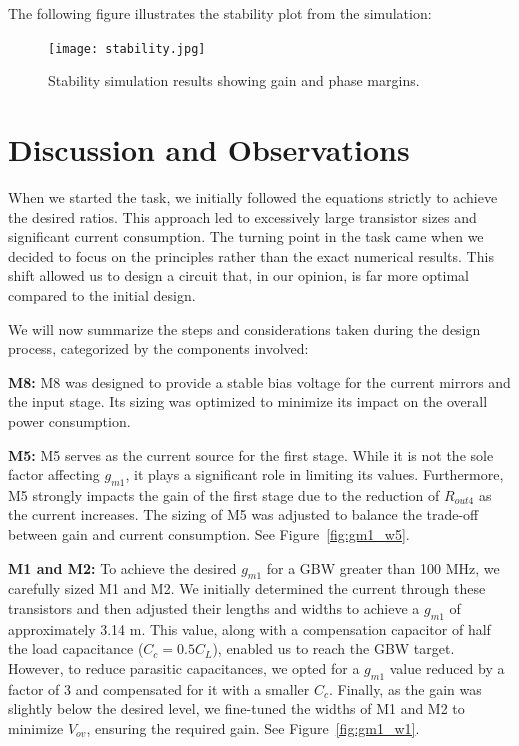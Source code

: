 \documentclass[12pt,a4paper]{article}
\begin{document}
The following figure illustrates the stability plot from the simulation:

\begin{figure}[H]
    \centering
    \texttt{[image: stability.jpg]}
    \caption{Stability simulation results showing gain and phase margins.}
    \label{fig:stability}
\end{figure}
\pagebreak

\section*{Discussion and Observations}
When we started the task, we initially followed the equations strictly to achieve the desired ratios. This approach led to excessively large transistor sizes and significant current consumption. The turning point in the task came when we decided to focus on the principles rather than the exact numerical results. This shift allowed us to design a circuit that, in our opinion, is far more optimal compared to the initial design.

We will now summarize the steps and considerations taken during the design process, categorized by the components involved:

\textbf{M8:}  
M8 was designed to provide a stable bias voltage for the current mirrors and the input stage. Its sizing was optimized to  minimize its impact on the overall power consumption.

\textbf{M5:}  
M5 serves as the current source for the first stage. While it is not the sole factor affecting $g_{m1}$, it plays a significant role in limiting its values. Furthermore, M5 strongly impacts the gain of the first stage due to the reduction of $R_{out4}$ as the current increases. The sizing of M5 was adjusted to balance the trade-off between gain and current consumption. See Figure~\ref{fig:gm1_w5}.  

\textbf{M1 and M2:}  
To achieve the desired $g_{m1}$ for a GBW greater than 100 MHz, we carefully sized M1 and M2. We initially determined the current through these transistors and then adjusted their lengths and widths to achieve a $g_{m1}$ of approximately 3.14 m. This value, along with a compensation capacitor of half the load capacitance ($C_c = 0.5C_L$), enabled us to reach the GBW target. However, to reduce parasitic capacitances, we opted for a $g_{m1}$ value reduced by a factor of 3 and compensated for it with a smaller $C_c$. Finally, as the gain was slightly below the desired level, we fine-tuned the widths of M1 and M2 to minimize $V_{ov}$, ensuring the required gain. See Figure~\ref{fig:gm1_w1}.
\end{document}
